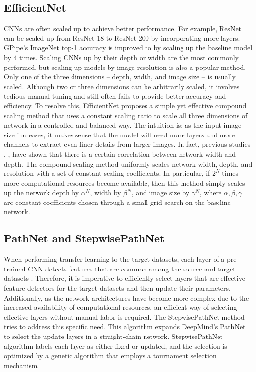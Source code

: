 \documentclass[a4paper,fleqn]{cas-sc}
\begin{document}
\subsection{EfficientNet}
CNNs are often scaled up to achieve better performance. For example, ResNet \cite{HeZhang2016} can be scaled up from ResNet-18 to ResNet-200 by incorporating more layers. GPipe's \cite{HuangCheng2018} ImageNet top-1 accuracy is improved to  by scaling up the baseline model by 4 times. Scaling CNNs up by their depth \cite{HeZhang2016} or width \cite{Zagoruyko2016} are the most commonly performed, but scaling up models by image resolution \cite{HuangCheng2018} is also a popular method. Only one of the three dimensions -- depth, width, and image size -- is usually scaled. Although two or three dimensions can be arbitrarily scaled, it involves tedious manual tuning and still often fails to provide better accuracy and efficiency. To resolve this, EfficientNet proposes a simple yet effective compound scaling method that uses a constant scaling ratio to scale all three dimensions of network in a controlled and balanced way. The intuition is: as the input image size increases, it makes sense that the model will need more layers and more channels to extract even finer details from larger images. In fact, previous studies \cite{RaghuPoole2017}, \cite{LuPu2018}, \cite{Zagoruyko2016} have shown that there is a certain correlation between network width and depth. The compound scaling method uniformly scales network width, depth, and resolution with a set of constant scaling coefficients. In particular, if \(2^N\) times more computational resources become available, then this method simply scales up the network depth by \(\alpha^N\), width by \(\beta^N\), and image size by \(\gamma^N\), where \(\alpha, \beta, \gamma\) are constant coefficients chosen through a small grid search on the baseline network.

\subsection{PathNet and StepwisePathNet}

When performing transfer learning to the target datasets, each layer of a pre-trained CNN detects features that are common among the source and target datasets \cite{ZeilerFergus2014}. Therefore, it is imperative to efficiently select layers that are effective feature detectors for the target datasets and then update their parameters. Additionally, as the network architectures have become more complex due to the increased availability of computational resources, an efficient way of selecting effective layers without manual labor is required. The StepwisePathNet method \cite{ImaiKawai2020} tries to address this specific need. This algorithm expands DeepMind's PathNet \cite{FernandoBanarse2017} to select the update layers in a straight-chain network. StepwisePathNet algorithm labels each layer as either fixed or updated, and the selection is optimized by a genetic algorithm that employs a tournament selection mechanism. %
\end{document}

